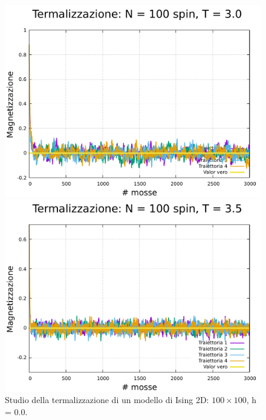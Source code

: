 \begin{figure}[H]
    \begin{minipage}{0.45\textwidth}  
      \centering
      \includegraphics[page=1, width=\textwidth]{Immagini/simIsing2D/metro/term/term_100_3.0.pdf}
      \caption{$T\,=\,3.0$}
    \end{minipage}\hfill
    \begin{minipage}{0.45\textwidth}  
      \centering
      \includegraphics[page=1, width=\textwidth]{Immagini/simIsing2D/metro/term/term_100_3.5.pdf}
      \caption{$T\,=\,3.5$}
    \end{minipage}
    \caption{Studio della termalizzazione di un modello di Ising 2D: $100 \times 100$, h = 0.0.}
\end{figure}

